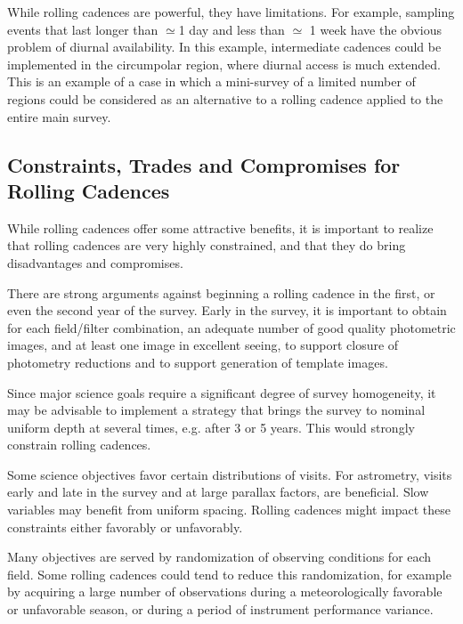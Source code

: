 While rolling cadences are powerful, they have limitations.  For example, sampling events that last longer than $\simeq$1 day and less than $\simeq$ 1 week have the obvious problem of diurnal availability.  In this example, intermediate cadences could be implemented in the circumpolar region, where diurnal access is much extended.  This is an example of a case in which a mini-survey of a limited number of regions could be considered as an alternative to a rolling cadence applied to the entire main survey.


\subsection{ Constraints, Trades and Compromises for Rolling Cadences}
\label{sec:rolling:trades}

While rolling cadences offer some attractive benefits, it is important to realize that rolling cadences are very highly constrained, and that they do bring disadvantages and compromises.

There are strong arguments against beginning a rolling cadence in the first, or even the second year of the survey.  Early in the survey, it is important to obtain for each field/filter combination, an adequate number of good quality photometric images, and at least one image in excellent seeing, to support closure of photometry reductions and to support generation of template images.

Since major science goals require a significant degree of survey homogeneity, it may be advisable to implement a strategy that brings the survey to nominal uniform depth at several times, e.g. after 3 or 5 years.  This would strongly constrain rolling cadences.

Some science objectives favor certain distributions of visits.  For astrometry, visits early and late in the survey and at large parallax factors, are beneficial.  Slow variables may benefit from uniform spacing.  Rolling cadences might impact these constraints either favorably or unfavorably.

Many objectives are served by randomization of observing conditions for each field.  Some rolling cadences could tend to reduce this randomization, for example by acquiring a large number of observations during a meteorologically favorable or unfavorable season, or during a period of instrument performance variance.

